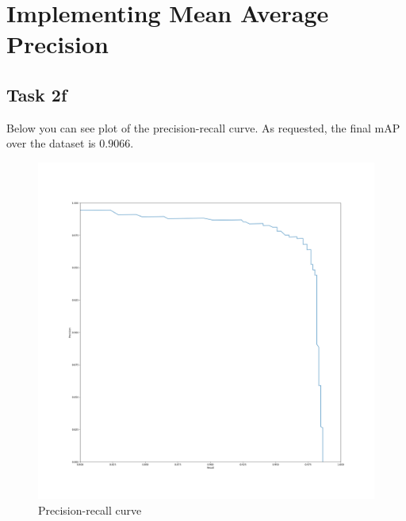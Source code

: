 \clearpage
\section{Implementing Mean Average Precision}
\subsection*{Task 2f}

Below you can see plot of the precision-recall curve. 
As requested, the final mAP over the dataset is $0.9066$.

\begin{figure}[h!]
    \centering
    \includegraphics[width=\textwidth]{Images/task2f.png}
    \caption{Precision-recall curve}
\end{figure}





